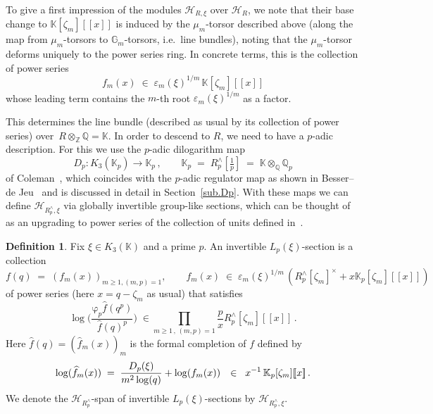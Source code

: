 \documentclass[12pt,reqno]{amsart}
\theoremstyle{definition}
\newtheorem{definition}[proposition]{Definition}
\def\BZ{\mathbb Z}
\def\BQ{\mathbb Q}
\def\BK{\mathbb K}
\def\calH{\mathcal H}
\def\ve{\varepsilon}
\def\be{\begin{equation}}
\def\ee{\end{equation}}
\def\z{\zeta}
\def\={\;=\;}
\def\inn{\;\in\;}
\def\fr{\mathrm{\varphi}_p}
\begin{document}
To give a first impression of the modules $\calH_{R,\xi}$ over $\calH_R$, we note
that their base change to $\BK[\z_m][\![x]\!]$ is induced by the $\mu_m$-torsor
described above (along the map from $\mu_m$-torsors to $\mathbb G_m$-torsors,
i.e.~line bundles),
noting that the $\mu_m$-torsor deforms uniquely to the power series ring. In concrete
terms, this is the collection of power series
\be
f_{m}(x)\inn\varepsilon_{m}(\xi)^{1/m}\,\BK[\z_m][\![x]\!]
\ee
whose leading term contains the $m$-th root $\ve_m(\xi)^{1/m}$ as a factor.

This determines the line bundle (described as usual by its collection of power
series) over~$R\otimes_{\BZ}\BQ=\BK$. In order to descend to $R$, we need to have
a $p$-adic description. For this we use the $p$-adic dilogarithm map
\be
\label{Dpdef2}
D_p:K_3(\BK_p) \to \BK_p\,,\qquad\BK_{p} \= R^{\wedge}_p[\tfrac{1}{p}]
\= \BK\otimes_{\BQ} \BQ_p
\ee
of Coleman~\cite{Coleman}, which coincides with the $p$-adic regulator map
as shown in Besser--de Jeu~\cite[Thm.1.6(2)]{BJ:syntomic} and is discussed in detail
in Section~\ref{sub.Dp}. With these maps we can define $\calH_{R^\wedge_p,\xi}$
via globally invertible group-like sections,
which can be thought of as an upgrading to power series of the collection of units
defined in~\cite{CGZ}.

\begin{definition}
\label{def.HRxi}
Fix $\xi \in K_3(\BK)$ and a prime $p$. An invertible $L_p(\xi)$-section is a
collection
\be
\label{fcyclic.loc}
f(q) \=(f_{m}(x))_{m\geq1,(m,p)=1}, \qquad
f_{m}(x)\inn \varepsilon_{m}(\xi)^{1/m}\,
(R^\wedge_p[\z_m]^{\times} + x\BK_p[\z_m][\![x]\!])
\ee
of power series (here $x=q-\z_m$ as usual) that satisfies
\be
\label{fxidef}
\log\bigg(\frac{\fr \widehat{f}(q^p)}{\widehat{f}(q)^p}\bigg)\;
\in \prod_{m \geq1\,,\,(m,p)=1} \frac{p}{x}R^\wedge_p[\z_m][\![x]\!]\, .
\ee
Here $\widehat{f}(q)=(\widehat{f}_m(x))_m$ is the formal completion of $f$ defined by
\be
\label{hatfm}
\log(\widehat{f}_m(x))\=\frac{D_{p}(\xi)}{m^2\log(q)}+\log(f_m(x))
\;\;\,\in\;\; x^{-1}\thinspace\BK_p[\z_m][\![x]\!]\, .
\ee
We denote the $\calH_{R_p^\wedge}$-span of invertible $L_p(\xi)$-sections by
$\calH_{R_p^\wedge,\xi}$.
\end{definition}
\end{document}
